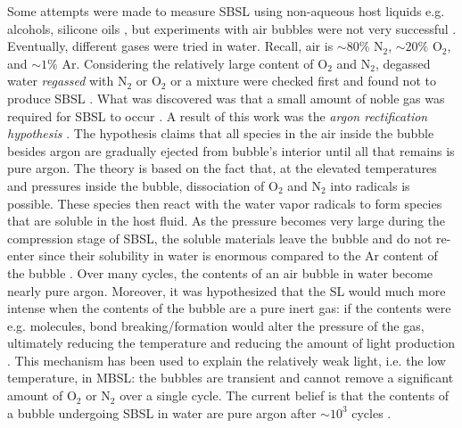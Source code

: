 \documentclass[prb,aps,nofootinbib,superscriptaddress,floatfix]{revtex4-2}
\begin{document}
Some attempts were made to measure SBSL using non-aqueous host liquids e.g. alcohols, silicone oils \cite{weninger1995sonoluminescence,barber1997defining}, but experiments with air bubbles were not very successful \cite{barber1997defining}. Eventually, different gases were tried in water. Recall, air is $\sim 80\%$ N$_2$, $\sim 20\%$ O$_2$, and $\sim 1\% $ Ar. Considering the relatively large content of O$_2$ and N$_2$, degassed water \emph{regassed} with N$_2$ or O$_2$ or a mixture were checked first and found not to produce SBSL \cite{hiller1994effect}. What was discovered was that a small amount of noble gas was required for SBSL to occur \cite{barber1997defining,hiller1994effect,brenner2002single}. A result of this work was the \emph{argon rectification hypothesis} \cite{lohse1997sonoluminescing,brenner2002single,yasui2018acoustic,suslick2008inside}. The hypothesis claims that all species in the air inside the bubble besides argon are gradually ejected from bubble's interior until all that remains is pure argon. The theory is based on the fact that, at the elevated temperatures and pressures inside the bubble, dissociation of O$_2$ and N$_2$ into radicals is possible. These species then react with the water vapor radicals to form species that are soluble in the host fluid. As the pressure becomes very large during the compression stage of SBSL, the soluble materials leave the bubble and do not re-enter since their solubility in water is enormous compared to the Ar content of the bubble \cite{lohse1997sonoluminescing}. Over many cycles, the contents of an air bubble in water become nearly pure argon. Moreover, it was hypothesized that the SL would much more intense when the contents of the bubble are a pure inert gas: if the contents were e.g. molecules, bond breaking/formation would alter the pressure of the gas, ultimately reducing the temperature and reducing the amount of light production \cite{brenner2002single,yasui2018acoustic,lohse2018bubble,suslick2008inside}. This mechanism has been used to explain the relatively weak light, i.e. the low temperature, in MBSL: the bubbles are transient and cannot remove a significant amount of O$_2$ or N$_2$ over a single cycle. The current belief is that the contents of a bubble undergoing SBSL in water are pure argon after $\sim 10^3$ cycles \cite{brenner2002single,yasui2018acoustic}. 
\end{document}
